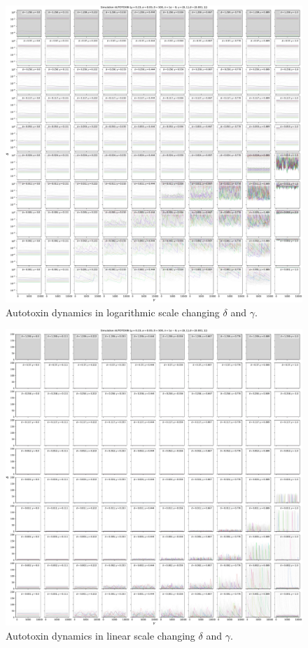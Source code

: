 \documentclass[11pt,a4paper,fleqn]{scrartcl}
\begin{document}
\clearpage

\begin{figure}[H]
    \centering
    \includegraphics[width=\linewidth]{DeltaGamma/10autotoxFP.pdf}
    \caption{Autotoxin dynamics in logarithmic scale changing $\delta$ and $\gamma$.}
\end{figure}

\clearpage

\begin{figure}[H]
    \centering
    \includegraphics[width=\linewidth]{DeltaGamma/10AutotoxFPLinear.pdf}
    \caption{Autotoxin dynamics in linear scale changing $\delta$ and $\gamma$.}
\end{figure}
\end{document}
